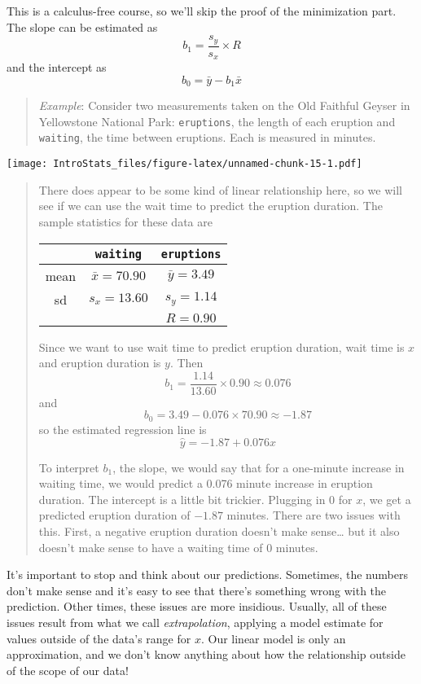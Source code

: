 \documentclass[
]{book}
\begin{document}
This is a calculus-free course, so we'll skip the proof of the minimization part. The slope can be estimated as \[b_1 = \frac{s_y}{s_x}\times R\] and the intercept as \[b_0 = \bar{y} - b_1 \bar{x}\]

\begin{quote}
\emph{Example}: Consider two measurements taken on the Old Faithful Geyser in Yellowstone National Park: \texttt{eruptions}, the length of each eruption and \texttt{waiting}, the time between eruptions. Each is measured in minutes.
\end{quote}

\texttt{[image: IntroStats\_files/figure-latex/unnamed-chunk-15-1.pdf]}

\begin{quote}
There does appear to be some kind of linear relationship here, so we will see if we can use the wait time to predict the eruption duration. The sample statistics for these data are

\begin{longtable}[]{@{}ccc@{}}
\toprule
& \texttt{waiting} & \texttt{eruptions} \\
\midrule
\endhead
mean & \(\bar{x}=70.90\) & \(\bar{y}=3.49\) \\
sd & \(s_x=13.60\) & \(s_y=1.14\) \\
& & \(R = 0.90\) \\
\bottomrule
\end{longtable}

Since we want to use wait time to predict eruption duration, wait time is \(x\) and eruption duration is \(y.\) Then \[b_1 = \frac{1.14}{13.60}\times 0.90 \approx 0.076 \] and \[b_0 = 3.49 - 0.076\times 70.90 \approx -1.87\] so the estimated regression line is \[\hat{y} = -1.87 + 0.076x\]

To interpret \(b_1\), the slope, we would say that for a one-minute increase in waiting time, we would predict a 0.076 minute increase in eruption duration. The intercept is a little bit trickier. Plugging in 0 for \(x\), we get a predicted eruption duration of \(-1.87\) minutes. There are two issues with this. First, a negative eruption duration doesn't make sense\ldots{} but it also doesn't make sense to have a waiting time of 0 minutes.
\end{quote}

It's important to stop and think about our predictions. Sometimes, the numbers don't make sense and it's easy to see that there's something wrong with the prediction. Other times, these issues are more insidious. Usually, all of these issues result from what we call \emph{extrapolation}, applying a model estimate for values outside of the data's range for \(x\). Our linear model is only an approximation, and we don't know anything about how the relationship outside of the scope of our data!
\end{document}
